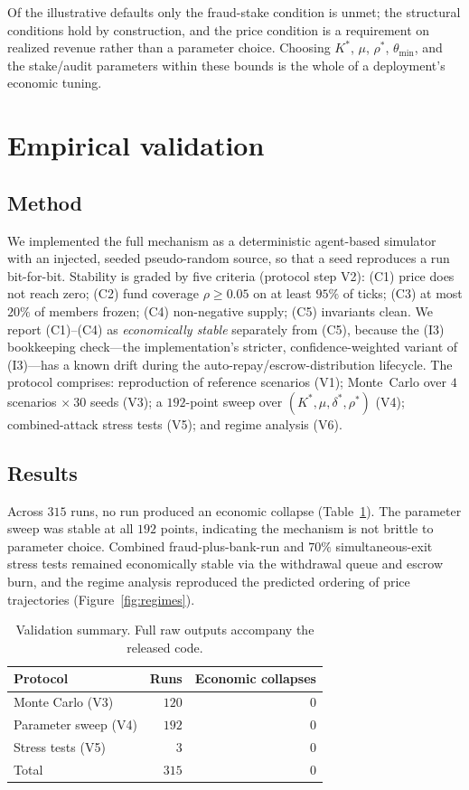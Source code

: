 \documentclass[11pt]{article}
\theoremstyle{plain}
\theoremstyle{definition}
\theoremstyle{remark}
\begin{document}
Of the illustrative defaults only the fraud-stake condition is unmet; the structural conditions hold by construction, and the price condition is a requirement on realized revenue rather than a parameter choice. Choosing $K^*$, $\mu$, $\rho^*$, $\theta_{\min}$, and the stake/audit parameters within these bounds is the whole of a deployment's economic tuning.

\section{Empirical validation}\label{sec:empirical}

\subsection{Method}

We implemented the full mechanism as a deterministic agent-based simulator with an injected, seeded pseudo-random source, so that a seed reproduces a run bit-for-bit. Stability is graded by five criteria (protocol step V2): (C1) price does not reach zero; (C2) fund coverage $\rho \ge 0.05$ on at least $95\%$ of ticks; (C3) at most $20\%$ of members frozen; (C4) non-negative supply; (C5) invariants clean. We report (C1)--(C4) as \emph{economically stable} separately from (C5), because the (I3) bookkeeping check---the implementation's stricter, confidence-weighted variant of (I3)---has a known drift during the auto-repay/escrow-distribution lifecycle. The protocol comprises: reproduction of reference scenarios (V1); Monte~Carlo over $4$ scenarios $\times\ 30$ seeds (V3); a $192$-point sweep over $(K^*,\mu,\delta^*,\rho^*)$ (V4); combined-attack stress tests (V5); and regime analysis (V6).

\subsection{Results}

Across $315$ runs, no run produced an economic collapse (Table~\ref{tab:results}). The parameter sweep was stable at all $192$ points, indicating the mechanism is not brittle to parameter choice. Combined fraud-plus-bank-run and $70\%$ simultaneous-exit stress tests remained economically stable via the withdrawal queue and escrow burn, and the regime analysis reproduced the predicted ordering of price trajectories (Figure~\ref{fig:regimes}).

\begin{table}[h]
\centering
\begin{tabular}{lrr}
\toprule
Protocol & Runs & Economic collapses\\
\midrule
Monte Carlo (V3) & $120$ & $0$\\
Parameter sweep (V4) & $192$ & $0$\\
Stress tests (V5) & $3$ & $0$\\
\midrule
Total & $315$ & $0$\\
\bottomrule
\end{tabular}
\caption{Validation summary. Full raw outputs accompany the released code.}
\label{tab:results}
\end{table}
\end{document}
